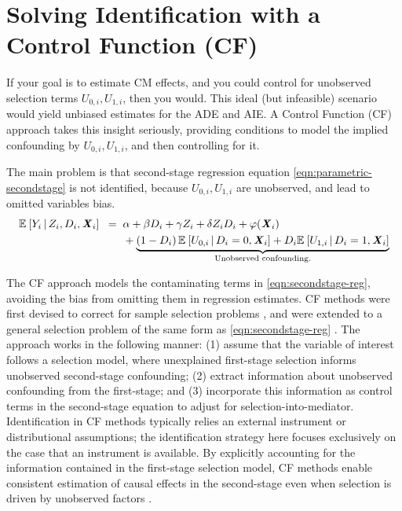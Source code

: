 \section{Solving Identification with a Control Function (CF)}
\label{sec:selectionmodel}
If your goal is to estimate CM effects, and you could control for unobserved selection terms $U_{0,i}, U_{1,i}$, then you would.
This ideal (but infeasible) scenario would yield unbiased estimates for the ADE and AIE.
A Control Function (CF) approach takes this insight seriously, providing conditions to model the implied confounding by $U_{0,i}, U_{1,i}$, and then controlling for it.

The main problem is that second-stage regression equation \eqref{eqn:parametric-secondstage} is not identified, because $U_{0,i},U_{1,i}$ are unobserved, and lead to omitted variables bias.
\begin{align}
    \mathbb{E}_{} \left[ Y_i \, \middle\vert \, Z_i, D_i, \boldsymbol{\mathit{X}}_i \right] \;\; =& \;\;
        \alpha
        + \beta D_i
        + \gamma Z_i
        + \delta Z_i D_i
        + \varphi(\boldsymbol{\mathit{X}}_i) \nonumber \\
        \label{eqn:secondstage-reg}
        & \;\; +\underbrace{\left( 1 - D_i
            \right) \mathbb{E}_{} \left[  U_{0,i}  \, \middle\vert \, D_i = 0, \boldsymbol{\mathit{X}}_i \right]
                + D_i \mathbb{E}_{} \left[  U_{1,i}  \, \middle\vert \, D_i = 1, \boldsymbol{\mathit{X}}_i \right]}_{
                    \text{Unobserved confounding.}}
\end{align}

The CF approach models the contaminating terms in \eqref{eqn:secondstage-reg}, avoiding the bias from omitting them in regression estimates.
CF methods were first devised to correct for sample selection problems \citep{heckman1974shadow}, and were extended to a general selection problem of the same form as \autoref{eqn:secondstage-reg} \citep{heckman1979sample}.
The approach works in the following manner: (1) assume that the variable of interest follows a selection model, where unexplained first-stage selection informs unobserved second-stage confounding; (2) extract information about unobserved confounding from the first-stage; and (3) incorporate this information as control terms in the second-stage equation to adjust for selection-into-mediator.
Identification in CF methods typically relies an external instrument or distributional assumptions; the identification strategy here focuses exclusively on the case that an instrument is available.
By explicitly accounting for the information contained in the first-stage selection model, CF methods enable consistent estimation of causal effects in the second-stage even when selection is driven by unobserved factors \citep{florens2008identification}.

